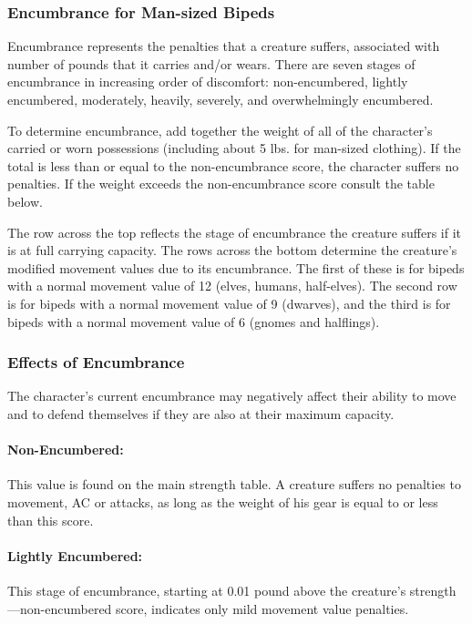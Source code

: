 \begin{multicols}{2}
\subsubsection*{Encumbrance for Man-sized Bipeds}

Encumbrance represents the penalties that a creature suffers, associated with number of pounds that it carries and/or wears.  There are seven stages of encumbrance in increasing order of discomfort: non-encumbered, lightly encumbered, moderately, heavily, severely, and overwhelmingly encumbered.  

To determine encumbrance, add together the weight of all of the character's carried or worn possessions (including about 5 lbs. for man-sized clothing).  If the total is less than or equal to the non-encumbrance score, the character suffers no penalties.  If the weight exceeds the non-encumbrance score consult the table below.  

The row across the top reflects the stage of encumbrance the creature suffers if it is at full carrying capacity.  The rows across the bottom determine the creature's modified movement values due to its encumbrance.  The first of these is for bipeds with a normal movement value of 12 (elves, humans, half-elves).  The second row is for bipeds with a normal movement value of 9 (dwarves), and the third is for bipeds with a normal movement value of 6 (gnomes and halflings).

 
\subsubsection*{Effects of Encumbrance}

The character's current encumbrance may negatively affect their ability to move and to defend themselves if they are also at their maximum capacity.

\paragraph{Non-Encumbered:} This value is found on the main strength table.  A creature suffers no penalties to movement, AC or attacks, as long as the weight of his gear is equal to or less than this score.

\paragraph{Lightly Encumbered:} This stage of encumbrance, starting at 0.01 pound above the creature's strength---non-encumbered score, indicates only mild movement value penalties.  


\end{multicols}
